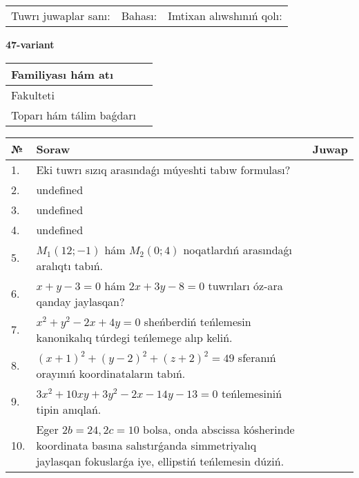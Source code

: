 \documentclass{article}
\begin{document}
\vspace{0.7cm}

\begin{tabular}{lll}
Tuwrı juwaplar sanı: \underline{\hspace{1cm}} & 
Bahası: \underline{\hspace{1cm}} & 
Imtixan alıwshınıń qolı: \underline{\hspace{2cm}} \\
\end{tabular}

\egroup

\newpage


\textbf{47-variant}\\

\bgroup
\def\arraystretch{1.6} %

\begin{tabular}{|m{5.7cm}|m{9.5cm}|}
\hline
Familiyası hám atı & \\
\hline
Fakulteti  & \\
\hline
Toparı hám tálim baǵdarı  & \\
\hline
\end{tabular}

\vspace{0.7cm}

\begin{tabular}{|m{0.7cm}|m{10cm}|m{4cm}|}
\hline
№ & Soraw & Juwap \\
\hline
1. & Eki tuwrı sızıq arasındaǵı múyeshti tabıw formulası? &  \\
\hline
2. & undefined &  \\
\hline
3. & undefined &  \\
\hline
4. & undefined &  \\
\hline
5. & \(M_{1} (12; - 1)\) hám \(M_{2} (0;4)\) noqatlardıń arasındaǵı aralıqtı tabıń. &  \\
\hline
6. & \(x + y - 3 = 0\) hám \(2 x + 3 y - 8 = 0\) tuwrıları óz-ara qanday jaylasqan? &  \\
\hline
7. & \(x^{2} + y^{2} - 2 x + 4 y = 0\) sheńberdiń teńlemesin kanonikalıq túrdegi teńlemege alıp keliń. &  \\
\hline
8. & \((x + 1) ^{2} + (y - 2) ^{2} + (z + 2) ^{2} = 49\) sferanıń orayınıń koordinataların tabıń. &  \\
\hline
9. & \(3 x^{2} + 10 xy + 3 y^{2} - 2 x - 14 y - 13 = 0\) teńlemesiniń tipin anıqlań. &  \\
\hline
10. & Eger \(2 b = 24, 2 c = 10\) bolsa, onda abscissa kósherinde koordinata basına salıstırǵanda simmetriyalıq jaylasqan fokuslarǵa iye, ellipstiń teńlemesin dúziń. & \\
\hline
\end{tabular}
\end{document}
